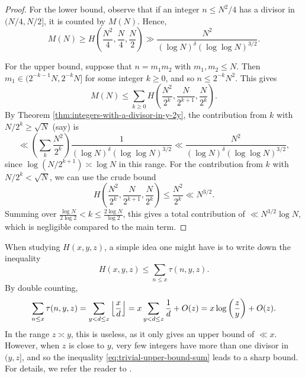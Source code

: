 \begin{proof}
    For the lower bound, observe that if an integer $n \le N^2 / 4$ has a divisor in $(N/4, N/2]$, it is counted by $M(N)$. 
    Hence, 
    \begin{equation*}
        M(N) \ge H\left( \frac{N^2}{4}, \frac{N}{4}, \frac{N}{2} \right) \gg \frac{N^2}{(\log N)^\delta (\log \log N)^{3/2}}.
    \end{equation*}

    For the upper bound, suppose that $n = m_1 m_2$ with $m_1, m_2 \le N$. 
    Then $m_1 \in (2^{-k-1} N, 2^{-k}N]$ for some integer $k \ge 0$, and so $n \le 2^{-k} N^2$.
    This gives
    \begin{equation*}
        M(N) \le \sum \limits_{k \ge 0} H \left(\frac{N^2}{2^k}, \frac{N}{2^{k + 1}}, \frac{N}{2^k} \right).
    \end{equation*}
    By Theorem \ref{thm:integers-with-a-divisor-in-y-2y}, the contribution from $k$ with $N/2^{k} \ge \sqrt{N}$ (say) is 
    \begin{equation*}
        \ll \left( \sum \limits_{k} \frac{N^2}{2^k} \right) \frac{1}{(\log N)^\delta (\log \log N)^{3/2}} \ll \frac{N^2}{(\log N)^\delta (\log \log N)^{3/2}},
    \end{equation*}
    since $\log (N/2^{k + 1}) \asymp \log N$ in this range.
    For the contribution from $k$ with $N/2^{k} < \sqrt{N}$, we can use the crude bound 
    \begin{equation*}
        H\left(\frac{N^2}{2^{k}}, \frac{N}{2^{k + 1}}, \frac{N}{2^{k}} \right) \le \frac{N^2}{2^{k}} \ll N^{3/2}.
    \end{equation*}
    Summing over $\frac{\log N}{2\log 2} < k \le \frac{2\log N }{\log 2}$, this gives a total contribution of $\ll N^{3/2} \log N$, which is negligible compared to the main term.
\end{proof}

When studying $H(x, y, z)$, a simple idea one might have is to write down the inequality
\begin{equation} \label{eq:trivial-upper-bound-sum}
    H(x, y, z) \le \sum \limits_{n \le x} \tau(n, y, z).
\end{equation}
By double counting, 
\begin{equation*}
    \sum \limits_{n \le x} \tau(n, y,z) = \sum \limits_{y < d \le z} \left\lfloor \frac{x}{d} \right\rfloor  = x \sum \limits_{y < d \le z} \frac{1}{d} + O(z) = x \log \left( \frac{z}{y} \right) + O(z).
\end{equation*}
In the range $z \asymp y$, this is useless, as it only gives an upper bound of $\ll x$.
However, when $z$ is close to $y$, very few integers have more than one divisor in $(y, z]$, and so the inequality \eqref{eq:trivial-upper-bound-sum} leads to a sharp bound.
For details, we refer the reader to \cite[Chapter 2]{divisors}.

